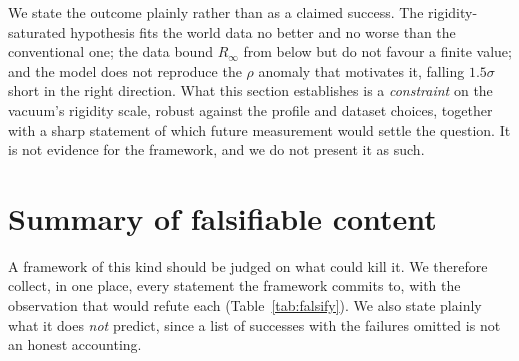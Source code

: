 \documentclass[aps,prd,preprint,nofootinbib,longbibliography]{revtex4-2}
\begin{document}
We state the outcome plainly rather than as a claimed success. The
rigidity-saturated hypothesis fits the world data no better and no worse than the
conventional one; the data bound $R_\infty$ from below but do not favour a finite
value; and the model does not reproduce the $\rho$ anomaly that motivates it,
falling $1.5\sigma$ short in the right direction. What this section establishes
is a \emph{constraint} on the vacuum's rigidity scale, robust against the profile
and dataset choices, together with a sharp statement of which future measurement
would settle the question. It is not evidence for the framework, and we do not
present it as such.

\section{Summary of falsifiable content}
\label{sec:predictions}

A framework of this kind should be judged on what could kill it. We therefore
collect, in one place, every statement the framework commits to, with the
observation that would refute each (Table~\ref{tab:falsify}). We also state
plainly what it does \emph{not} predict, since a list of successes with the
failures omitted is not an honest accounting.
\end{document}
